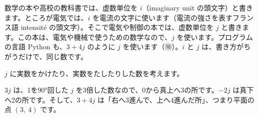 数学の本や高校の教科書では、虚数単位を $i$（imaginary unit の頭文字）と書きます。ところが電気では、$i$ を電流の文字に使います（電流の強さを表すフランス語 intensité の頭文字）。そこで電気や制御の本では、虚数単位を $j$ と書きます。この本は、電気や機械で使うための数学なので、$j$ を使います。プログラムの言語 Python も、$3+4j$ のように $j$ を使います（⑩）。$i$ と $j$ は、書き方がちがうだけで、同じ数です。


\leavevmode\label{bk:6-8:fukuso}$j$ に実数をかけたり、実数をたしたりした数を考えます。

$3j$ は、1を90°回した $j$ を3倍した数なので、0から真上へ3の所です。$-2j$ は真下へ2の所です。そして、$3+4j$ は「右へ3進んで、上へ4進んだ所」、つまり平面の点 $(3,\ 4)$ です。


